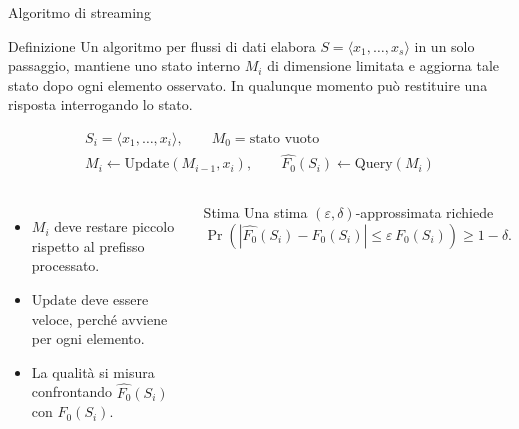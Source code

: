 \documentclass[aspectratio=169,11pt]{beamer}
\newcommand{\Fzero}{F_0}
\begin{document}
\begin{frame}{Algoritmo di streaming}
  \begin{block}{Definizione}
    \footnotesize
    Un algoritmo per flussi di dati elabora \(S=\langle x_1,\dots,x_s\rangle\)
    in un solo passaggio, mantiene uno stato interno \(M_i\) di dimensione
    limitata e aggiorna tale stato dopo ogni elemento osservato.
    In qualunque momento pu\`o restituire una risposta interrogando lo stato.
  \end{block}

  \vspace{-0.05cm}

  \[
    \begin{gathered}
      S_i=\langle x_1,\dots,x_i\rangle,
      \qquad
      M_0=\text{stato vuoto}\\
      M_i \leftarrow \mathrm{Update}(M_{i-1},x_i),
      \qquad
      \widehat{\Fzero}(S_i)\leftarrow \mathrm{Query}(M_i)
    \end{gathered}
  \]

  \begin{columns}[T,onlytextwidth]
      \begin{itemize}
        \small
        \item \(M_i\) deve restare piccolo rispetto al prefisso processato.
        \item \(\mathrm{Update}\) deve essere veloce, perch\'e avviene per ogni elemento.
        \item La qualit\`a si misura confrontando \(\widehat{\Fzero}(S_i)\) con \(\Fzero(S_i)\).
      \end{itemize}
      \begin{block}{Stima}
        \footnotesize
        Una stima \((\varepsilon,\delta)\)-approssimata richiede
        \[
          \Pr\!\left(
            |\widehat{\Fzero}(S_i)-\Fzero(S_i)|
            \le \varepsilon\,\Fzero(S_i)
          \right)\ge 1-\delta.
        \]
      \end{block}
  \end{columns}
\end{frame}
\end{document}
